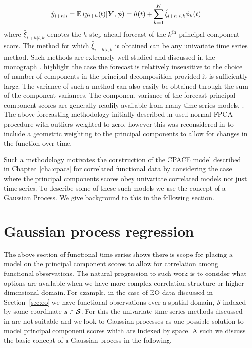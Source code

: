 \begin{equation}\label{eqn:forecast}
	\hat{y}_{i+h | i} = \operatorname{\mathbb{E}}\left(y_{i+h}(t) | \bm{{Y}}, \bm{{\phi}}\right) = \hat{\mu}(t) + \sum_{k=1}^K \hat{\xi}_{i+h | i, k} \phi_k(t) 
\end{equation}
where $\hat{\xi}_{i+h | i, k}$ denotes the $h$-step ahead forecast of the $k^\text{th}$ principal component score. The method for which $\hat{\xi}_{i+h | i, k}$ is obtained can be any univariate time series method. Such methods are extremely well studied and discussed in the monograph \citep{hyndman_forecasting_2018}. \citeauthor{hyndman_stochastic_2008} highlight the case the forecast is relatively insensitive to the choice of number of components in the principal decomposition provided it is sufficiently large.
The variance of such a method can also easily be obtained through the sum of the component variances. The component variance of the forecast principal component scores are generally readily available from many time series models, \citep{hyndman_forecasting_2018}. 
The above forecasting methodology initially described in \citep{hyndman_robust_2007} used normal FPCA procedure with outliers weighted to zero, however this was reconsidered in \citep{hyndman_forecasting_2009} to include a geometric weighting to the principal components to allow for changes in the function over time. 

Such a methodology motivates the construction of the CPACE model described in Chapter~\ref{cha:cpace} for correlated functional data by considering the case where the principal components scores obey univariate correlated models not just time series. To describe some of these such models we use the concept of a Gaussian Process. We give background to this in the following section. 

\section{Gaussian process regression \label{sec:gp}}
The above section of functional time series shows there is scope for placing a model on the principal component scores to allow for correlation among functional observations.
The natural progression to such work is to consider what options are available when we have more complex correlation structure or higher dimensional domain. 
For example, in the case of EO data discussed in Section~\ref{sec:eo} we have functional observations over a spatial domain, $\mathcal{S}$ indexed by some coordinate $\bm{{s}} \in \mathcal{S}$.
For this the univariate time series methods discussed in \citep{hyndman_forecasting_2009} are not suitable and we look to Gaussian processes as one possible solution to model principal component scores which are indexed by space.
A such we discuss the basic concept of a Gaussian process in the following. 

